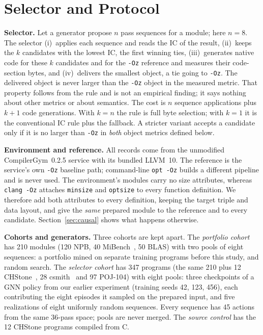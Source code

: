 \documentclass[conference,a4paper]{IEEEtran}
\begin{document}
\section{Selector and Protocol}
\textbf{Selector.} Let a generator propose $n$ pass sequences for a
module; here $n{=}8$. The selector (i)~applies each sequence and reads
the IC of the result, (ii)~keeps the $k$ candidates with the lowest IC,
the first winning ties, (iii)~generates native code for these $k$
candidates and for the \texttt{-Oz} reference and measures their
code-section bytes, and (iv)~delivers the smallest object, a tie going
to \texttt{-Oz}. The delivered object is never larger than the
\texttt{-Oz} object in the measured metric. That property follows from
the rule and is not an empirical finding; it says nothing about other
metrics or about semantics. The cost is $n$ sequence applications plus
$k{+}1$ code generations. With $k{=}n$ the rule is full byte selection;
with $k{=}1$ it is the conventional IC rule plus the fallback. A
stricter variant accepts a candidate only if it is no larger than
\texttt{-Oz} in \emph{both} object metrics defined below.

\textbf{Environment and reference.} All records come from the unmodified
CompilerGym~0.2.5 service with its bundled LLVM~10. The reference is the
service's own \texttt{-Oz} baseline path; command-line \texttt{opt -Oz}
builds a different pipeline and is never used. The environment's modules
carry no size attributes, whereas \texttt{clang -Oz} attaches
\texttt{minsize} and \texttt{optsize} to every function definition. We
therefore add both attributes to every definition, keeping the target
triple and data layout, and give the \emph{same} prepared module to the
reference and to every candidate. Section~\ref{sec:causal} shows what
happens otherwise.

\textbf{Cohorts and generators.} Three cohorts are kept apart. The
\emph{portfolio cohort} has 210 modules (120 NPB, 40
MiBench~\cite{mibench}, 50 BLAS) with two pools of eight sequences: a
portfolio mined on separate training programs before this study, and
random search. The \emph{selector cohort} has 347 programs (the same
210 plus 12 CHStone~\cite{chstone}, 28 csmith~\cite{csmith} and 97
POJ-104) with eight pools: three checkpoints of a GNN policy from our
earlier experiment (training seeds 42, 123, 456), each contributing the
eight episodes it sampled on the prepared input, and five realizations
of eight uniformly random sequences. Every sequence has 45 actions from
the same 36-pass space; pools are never merged. The \emph{source
control} has the 12 CHStone programs compiled from C.
\end{document}

